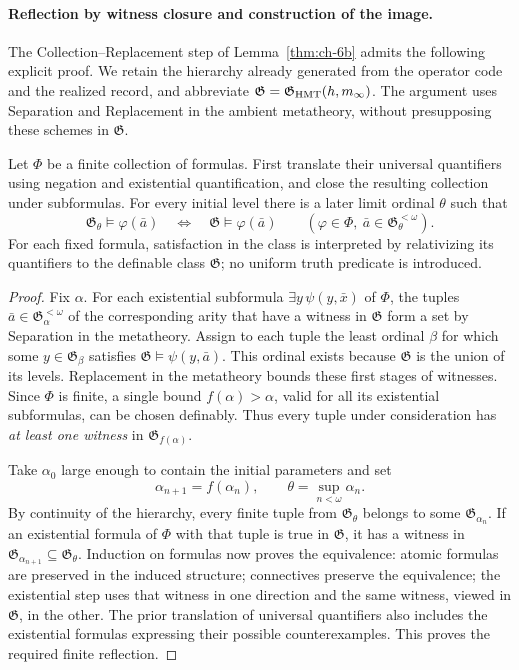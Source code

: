 \paragraph{Reflection by witness closure and construction of the image.}
The Collection--Replacement step of Lemma~\ref{thm:ch-6b} admits the following
explicit proof. We retain the hierarchy already generated from the operator
code and the realized record, and abbreviate
\(\mathfrak G=\mathfrak G_{\rm HMT}(h,m_\infty)\).
The argument uses Separation and Replacement in the ambient metatheory,
without presupposing these schemes in \(\mathfrak G\).

Let \(\Phi\) be a finite collection of formulas. First translate their
universal quantifiers using negation and existential quantification, and
close the resulting collection under subformulas. For every initial level
there is a later limit ordinal \(\theta\) such that
\[
 \mathfrak G_\theta\models\varphi(\bar a)
 \quad\Longleftrightarrow\quad
 \mathfrak G\models\varphi(\bar a)
 \qquad
 (\varphi\in\Phi,\ \bar a\in\mathfrak G_\theta^{<\omega}).
\]
For each fixed formula, satisfaction in the class is interpreted by
relativizing its quantifiers to the definable class \(\mathfrak G\);
no uniform truth predicate is introduced.

\begin{proof}
Fix \(\alpha\). For each existential subformula
\(\exists y\,\psi(y,\bar x)\) of \(\Phi\), the tuples
\(\bar a\in\mathfrak G_\alpha^{<\omega}\) of the corresponding arity
that have a witness in \(\mathfrak G\) form a set by Separation in the
metatheory. Assign to each tuple the least ordinal \(\beta\) for which
some \(y\in\mathfrak G_\beta\) satisfies
\(\mathfrak G\models\psi(y,\bar a)\). This ordinal exists because
\(\mathfrak G\) is the union of its levels. Replacement in the metatheory
bounds these first stages of witnesses. Since \(\Phi\) is finite, a
single bound \(f(\alpha)>\alpha\), valid for all its existential
subformulas, can be chosen definably. Thus every tuple under consideration
has \emph{at least one witness} in \(\mathfrak G_{f(\alpha)}\).

Take \(\alpha_0\) large enough to contain the initial parameters and set
\[
 \alpha_{n+1}=f(\alpha_n),\qquad
 \theta=\sup_{n<\omega}\alpha_n.
\]
By continuity of the hierarchy, every finite tuple from
\(\mathfrak G_\theta\) belongs to some \(\mathfrak G_{\alpha_n}\).
If an existential formula of \(\Phi\) with that tuple is true in
\(\mathfrak G\), it has a witness in
\(\mathfrak G_{\alpha_{n+1}}\subseteq\mathfrak G_\theta\).
Induction on formulas now proves the equivalence: atomic formulas are
preserved in the induced structure; connectives preserve the equivalence;
the existential step uses that witness in one direction and the same
witness, viewed in \(\mathfrak G\), in the other. The prior translation
of universal quantifiers also includes the existential formulas expressing
their possible counterexamples. This proves the required finite reflection.
\end{proof}

